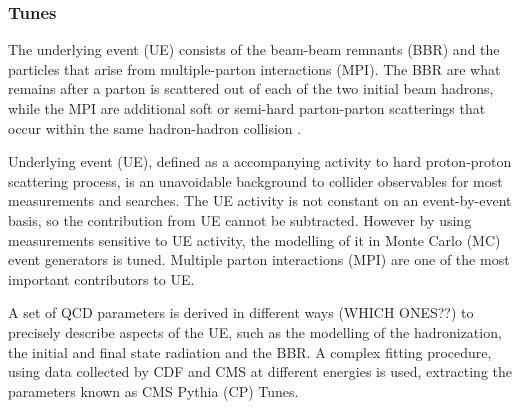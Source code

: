 \documentclass[11pt]{article}
\begin{document}
\subsubsection{Tunes}
\label{sec:org02f655c}
The underlying event (UE) consists of the beam-beam remnants (BBR) and the particles that arise from multiple-parton interactions (MPI).
The BBR are what remains after a parton is scattered out of each of the two initial beam hadrons, while the MPI are additional soft or semi-hard parton-parton scatterings that occur within the same hadron-hadron collision \cite{CMS_Tunes}.

Underlying event (UE), defined as a accompanying activity to hard proton-proton scattering process,
is an unavoidable background to collider observables for most measurements and searches. The UE
activity is not constant on an event-by-event basis, so the contribution from UE cannot be subtracted.
However by using measurements sensitive to UE activity, the modelling of it in Monte Carlo (MC) event
generators is tuned. Multiple parton interactions (MPI) are one of the most important contributors to UE. \cite{hllhc_physics}

A set of QCD parameters is derived in different ways (WHICH ONES??) to precisely describe aspects of the UE, such as the modelling of the hadronization, the initial and final state radiation and the BBR.
A complex fitting procedure, using data collected by CDF and CMS at different energies is used, extracting the parameters known as CMS Pythia (CP) Tunes.
\end{document}
